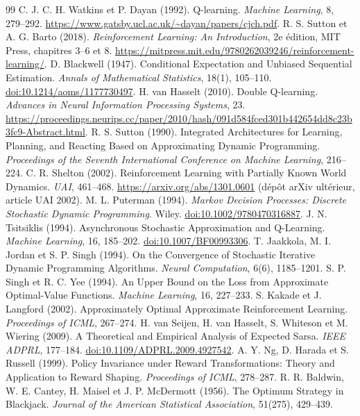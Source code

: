 \documentclass[11pt,a4paper]{article}
\theoremstyle{remark}\newtheorem*{remarque}{Remarque}
\newcommand{\1}{\mathbf 1}
\begin{document}
\begin{thebibliography}{99}
 C. J. C. H. Watkins et P. Dayan (1992).
Q-learning. \emph{Machine Learning}, 8, 279--292.
\url{https://www.gatsby.ucl.ac.uk/~dayan/papers/cjch.pdf}.
 R. S. Sutton et A. G. Barto (2018).
\emph{Reinforcement Learning: An Introduction}, 2e édition, MIT Press,
chapitres 3--6 et 8. \url{https://mitpress.mit.edu/9780262039246/reinforcement-learning/}.
 D. Blackwell (1947). Conditional Expectation and Unbiased
Sequential Estimation. \emph{Annals of Mathematical Statistics}, 18(1), 105--110.
\href{https://doi.org/10.1214/aoms/1177730497}{doi:10.1214/aoms/1177730497}.
 H. van Hasselt (2010). Double Q-learning.
\emph{Advances in Neural Information Processing Systems}, 23.
\url{https://proceedings.neurips.cc/paper/2010/hash/091d584fced301b442654dd8c23b3fc9-Abstract.html}.
 R. S. Sutton (1990). Integrated Architectures for Learning,
Planning, and Reacting Based on Approximating Dynamic Programming.
\emph{Proceedings of the Seventh International Conference on Machine Learning}, 216--224.
 C. R. Shelton (2002). Reinforcement Learning with Partially
Known World Dynamics. \emph{UAI}, 461--468.
\url{https://arxiv.org/abs/1301.0601} (dépôt arXiv ultérieur, article UAI 2002).
 M. L. Puterman (1994). \emph{Markov Decision Processes: Discrete
Stochastic Dynamic Programming}. Wiley.
\href{https://doi.org/10.1002/9780470316887}{doi:10.1002/9780470316887}.
 J. N. Tsitsiklis (1994). Asynchronous Stochastic Approximation
and Q-Learning. \emph{Machine Learning}, 16, 185--202.
\href{https://doi.org/10.1007/BF00993306}{doi:10.1007/BF00993306}.
 T. Jaakkola, M. I. Jordan et S. P. Singh (1994). On the
Convergence of Stochastic Iterative Dynamic Programming Algorithms.
\emph{Neural Computation}, 6(6), 1185--1201.
 S. P. Singh et R. C. Yee (1994). An Upper Bound on the Loss
from Approximate Optimal-Value Functions. \emph{Machine Learning}, 16, 227--233.
 S. Kakade et J. Langford (2002). Approximately Optimal Approximate
Reinforcement Learning. \emph{Proceedings of ICML}, 267--274.
 H. van Seijen, H. van Hasselt, S. Whiteson et M. Wiering
(2009). A Theoretical and Empirical Analysis of Expected Sarsa.
\emph{IEEE ADPRL}, 177--184.
\href{https://doi.org/10.1109/ADPRL.2009.4927542}{doi:10.1109/ADPRL.2009.4927542}.
 A. Y. Ng, D. Harada et S. Russell (1999). Policy Invariance under
Reward Transformations: Theory and Application to Reward Shaping.
\emph{Proceedings of ICML}, 278--287.
 R. R. Baldwin, W. E. Cantey, H. Maisel et J. P. McDermott (1956).
The Optimum Strategy in Blackjack. \emph{Journal of the American Statistical
Association}, 51(275), 429--439.
\end{thebibliography}
\end{document}

